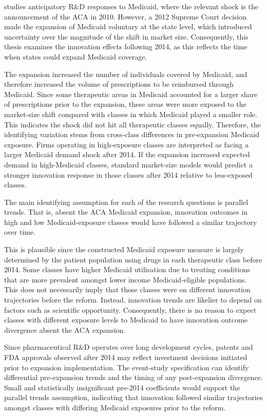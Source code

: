 \documentclass[12pt]{article}
\begin{document}
\citet{NBERw28755} studies anticipatory R\&D responses to Medicaid, where the relevant shock is the announcement of the ACA in 2010. However, a 2012 Supreme Court decision made the expansion of Medicaid voluntary at the state level, which introduced uncertainty over the magnitude of the shift in market size. Consequently, this thesis examines the innovation effects following 2014, as this reflects the time when states could expand Medicaid coverage.

The expansion increased the number of individuals covered by Medicaid, and therefore increased the volume of prescriptions to be reimbursed through Medicaid. Since some therapeutic areas in Medicaid accounted for a larger share of prescriptions prior to the expansion, these areas were more exposed to the market-size shift compared with classes in which Medicaid played a smaller role. This indicates the shock did not hit all therapeutic classes equally. Therefore, the identifying variation stems from cross-class differences in pre-expansion Medicaid exposure. Firms operating in high-exposure classes are interpreted as facing a larger Medicaid demand shock after 2014. If the expansion increased expected demand in high-Medicaid classes, standard market-size models would predict a stronger innovation response in those classes after 2014 relative to less-exposed classes.

The main identifying assumption for each of the research questions is parallel trends. That is, absent the ACA Medicaid expansion, innovation outcomes in high and low Medicaid-exposure classes would have followed a similar trajectory over time.

This is plausible since the constructed Medicaid exposure measure is largely determined by the patient population using drugs in each therapeutic class before 2014. Some classes have higher Medicaid utilisation due to treating conditions that are more prevalent amongst lower income Medicaid-eligible populations. This does not necessarily imply that those classes were on different innovation trajectories before the reform. Instead, innovation trends are likelier to depend on factors such as scientific opportunity. Consequently, there is no reason to expect classes with different exposure levels to Medicaid to have innovation outcome divergence absent the ACA expansion.

Since pharmaceutical R\&D operates over long development cycles, patents and FDA approvals observed after 2014 may reflect investment decisions initiated prior to expansion implementation. The event-study specification can identify differential pre-expansion trends and the timing of any post-expansion divergence. Small and statistically insignificant pre-2014 coefficients would support the parallel trends assumption, indicating that innovation followed similar trajectories amongst classes with differing Medicaid exposures prior to the reform.
\end{document}
